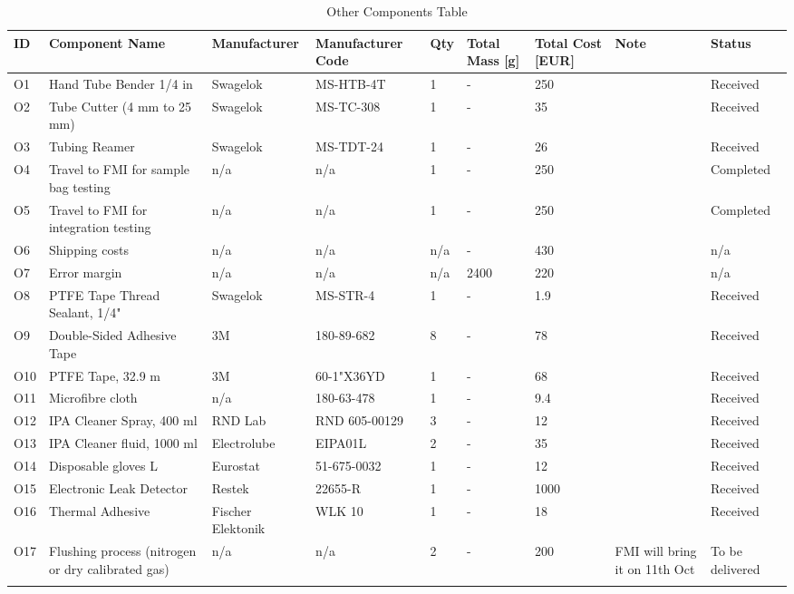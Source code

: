 \begin{longtable} {|m{}|m{}|m{}|m{}|m{}|m{}|m{}|m{}|m{}|} \hline \textbf{ID} & \textbf{Component Name} & \textbf{Manufacturer} & \textbf{Manufacturer Code} & \textbf{Qty} & \textbf{Total Mass [g]} & \textbf{Total Cost [EUR]}  & \textbf{Note}  & \textbf{Status} \\ \hline O1 & Hand Tube Bender 1/4 in & Swagelok & MS-HTB-4T & 1 & - & 250 &  & Received \\ \hline O2 & Tube Cutter (4 mm to 25 mm) & Swagelok & MS-TC-308 & 1 & - & 35 &  & Received \\ \hline O3 & Tubing Reamer & Swagelok & MS-TDT-24 & 1 & - & 26 &  & Received \\ \hline O4 & Travel to FMI for sample bag testing & n/a & n/a & 1 & - & 250 &  & Completed \\ \hline O5 & Travel to FMI for integration testing & n/a & n/a & 1 & - & 250 &  & Completed \\ \hline O6 & Shipping costs & n/a & n/a & n/a & - & 430 &  & n/a \\ \hline O7 & Error margin & n/a & n/a & n/a & 2400 & 220 &  & n/a \\ \hline O8 & PTFE Tape Thread Sealant, 1/4" & Swagelok & MS-STR-4 & 1 & - & 1.9 &  & Received \\ \hline O9 & Double-Sided Adhesive Tape & 3M & 180-89-682 & 8 & - & 78 &  & Received \\ \hline O10 & PTFE Tape, 32.9 m  & 3M & 60-1"X36YD  & 1 & - & 68 &  & Received \\ \hline O11 & Microfibre cloth & n/a & 180-63-478 & 1 & - & 9.4 &  & Received \\ \hline O12 & IPA Cleaner Spray, 400 ml & RND Lab & RND 605-00129 & 3 & - & 12 &  & Received \\ \hline O13 & IPA Cleaner fluid, 1000 ml &  Electrolube  & EIPA01L & 2 & - & 35 &  & Received \\ \hline O14 & Disposable gloves L & Eurostat &         51-675-0032 & 1 & - & 12 &  & Received \\ \hline O15 & Electronic Leak Detector & Restek & 22655-R & 1 & - & 1000 &  & Received \\ \hline O16 & Thermal Adhesive & Fischer Elektonik & WLK 10 & 1 & - & 18 &  & Received \\ \hline O17 & Flushing process (nitrogen or dry calibrated gas) & n/a & n/a & 2 & - & 200 & FMI will bring it on 11th Oct & To be delivered \\ \hline \caption{Other Components Table} \label{tab:component-table-other} \end{longtable} \raggedbottom